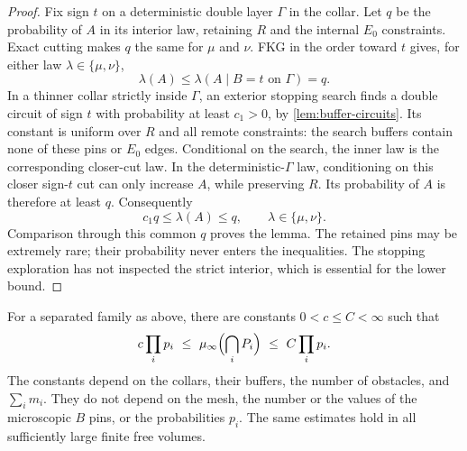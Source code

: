 \begin{proof}
Fix sign $t$ on a deterministic double layer $\Gamma$ in the collar.
Let $q$ be the probability of $A$ in its interior law, retaining $R$
and the internal $E_0$ constraints.  Exact cutting makes $q$ the same
for $\mu$ and $\nu$.  FKG in the order toward $t$ gives, for either
law $\lambda\in\{\mu,\nu\}$,
\begin{equation}\label{eq:rare-pin-upper}
 \lambda(A)\leq\lambda(A\mid B=t\text{ on }\Gamma)=q.
\end{equation}
In a thinner collar strictly inside $\Gamma$, an exterior stopping search finds
a double circuit of sign $t$ with probability at least $c_1>0$, by
\cref{lem:buffer-circuits}.  Its constant is uniform over $R$ and all
remote constraints: the search buffers contain none of these pins or
$E_0$ edges.  Conditional on the search, the inner law is the corresponding
closer-cut law.  In the deterministic-$\Gamma$ law, conditioning on this closer
sign-$t$ cut can only increase $A$, while preserving $R$.  Its probability
of $A$ is therefore at least $q$.  Consequently
\begin{equation}\label{eq:rare-pin-sandwich}
 c_1q\leq\lambda(A)\leq q,
 \qquad \lambda\in\{\mu,\nu\}.
\end{equation}
Comparison through this common $q$ proves the lemma.  The retained pins
may be extremely rare; their probability never enters the inequalities.
The stopping exploration has not inspected the strict interior, which
is essential for the lower bound.
\end{proof}

\begin{proposition}
\label{prop:pin-product}
For a separated family as above, there are constants $0<c\leq C<\infty$
such that
\begin{equation}\label{eq:pin-product}
 c\prod_i p_i\ \leq\ \mu_\infty\Bigl(\bigcap_iP_i\Bigr)
 \ \leq\ C\prod_i p_i.
\end{equation}
The constants depend on the collars, their buffers, the number of
obstacles, and $\sum_i m_i$.  They do not depend on the mesh, the number
or the values of the microscopic $B$ pins, or the probabilities $p_i$.
The same estimates hold in all sufficiently large finite free volumes.
\end{proposition}


